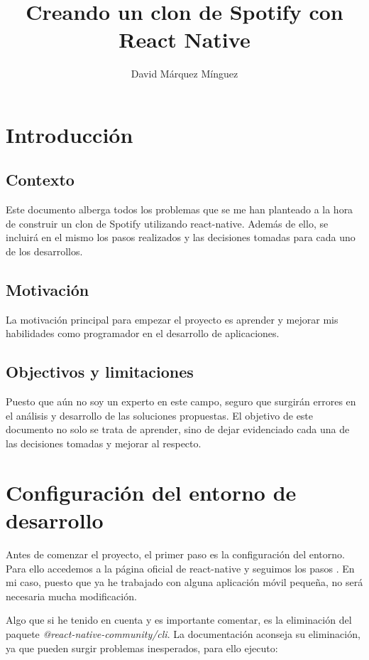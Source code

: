\documentclass[a4paper, 11pt]{article}
\title{Creando un clon de Spotify con React Native}
\author{David Márquez Mínguez}
\begin{document}
\maketitle
\tableofcontents

\pagebreak
\section{Introducción}

\subsection{Contexto}

Este documento alberga todos los problemas que se me han planteado a la hora de construir un clon de Spotify utilizando
react-native. Además de ello, se incluirá en el mismo los pasos realizados y las decisiones tomadas para cada uno de los
desarrollos.

\subsection{Motivación}

La motivación principal para empezar el proyecto es aprender y mejorar mis habilidades como programador en el desarrollo
de aplicaciones.

\subsection{Objectivos y limitaciones}

Puesto que aún no soy un experto en este campo, seguro que surgirán errores en el análisis y desarrollo de las soluciones
propuestas. El objetivo de este documento no solo se  trata de aprender, sino de dejar evidenciado cada una de las
decisiones tomadas y mejorar al respecto.


\pagebreak
\section{Configuración del entorno de desarrollo}

Antes de comenzar el proyecto, el primer paso es la configuración del entorno. Para ello accedemos a la página oficial de
react-native y seguimos los pasos \cite{setup-development-environment}. En mi caso, puesto que ya he trabajado con alguna
aplicación móvil pequeña, no será necesaria mucha modificación.

Algo que si he tenido en cuenta y es importante comentar, es la eliminación del paquete \emph{@react-native-community/cli}.
La documentación aconseja su eliminación, ya que pueden surgir problemas inesperados, para ello ejecuto:
\end{document}
